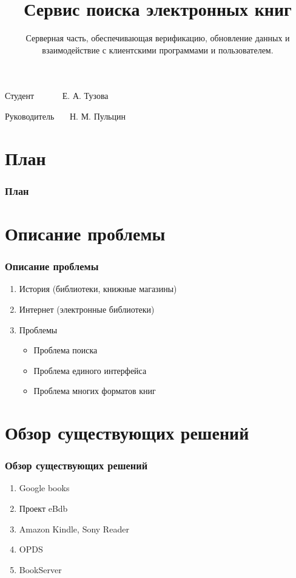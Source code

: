 \documentclass[handout]{beamer}
\title{Сервис поиска электронных книг }
\subtitle{Серверная часть, обеспечивающая верификацию, обновление данных и взаимодействие с клиентскими программами и пользователем.}
\date{}
\begin{document}
\begin{frame}
  \titlepage
  \begin{flushright}
    Студент~~~~~~  Е. А. Тузова
  
    Руководитель~~~  Н. М. Пульцин

  \end{flushright}
\end{frame}

\section*{План}
  \begin{frame}
    \frametitle{План}
    \tableofcontents[pausesections]

  \end{frame}

\section{Описание проблемы}
  \begin{frame}

    \frametitle{Описание проблемы}
    \begin{enumerate}
      \item История (библиотеки, книжные магазины)
      \item Интернет (электронные библиотеки)
      \item Проблемы
	      \begin{itemize}
		    \item Проблема поиска
            \item Проблема единого интерфейса
            \item Проблема многих форматов книг
	      \end{itemize}
      \end{enumerate}
  \end{frame}

\section{Обзор существующих решений}
  \begin{frame}
    \frametitle{Обзор существующих решений}

    \begin{enumerate}
      \item Google books
      \item Проект eBdb
      \item Amazon Kindle, Sony Reader
      \item OPDS
      \item BookServer
    \end{enumerate}
  \end{frame}
\end{document}
